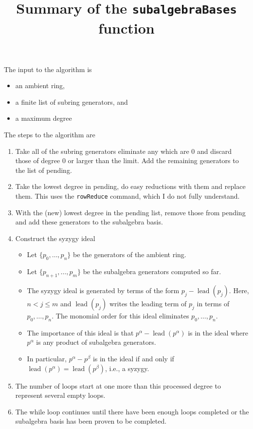 \documentclass[11pt]{amsart}
\title{Summary of the \texttt{subalgebraBases} function}
\DeclareMathOperator{\lead}{lead}
\newcommand{\alert}[1]{{\color{red}#1}}
\begin{document}
\maketitle

The input to the algorithm is
\begin{itemize}
\item an ambient ring,
\item a finite list of subring generators, and
\item a maximum degree
\end{itemize}
The steps to the algorithm are
\begin{enumerate}
\item Take all of the subring generators eliminate any which are 0 and discard those of degree 0 or larger than the limit.  Add the remaining generators to the list of pending.\label{step:discard}
\item Take the lowest degree in pending, do easy reductions with them and replace them.  \alert{This uses the \texttt{rowReduce} command, which I do not fully understand.}\label{step:lowestdegree}
\item With the (new) lowest degree in the pending list, remove those from pending and add these generators to the subalgebra basis.
\item Construct the syzygy ideal\label{step:syzygy}
\begin{itemize}
\item Let $\{p_0,\dots,p_n\}$ be the generators of the ambient ring.
\item Let $\{p_{n+1},\dots,p_m\}$ be the subalgebra generators computed so far.
\item The syzygy ideal is generated by terms of the form $p_j-\lead(p_j)$.  Here, $n<j\leq m$ and $\lead(p_j)$ writes the leading term of $p_j$ in terms of $p_0,\dots,p_n$.  The monomial order for this ideal eliminates $p_0,\dots,p_n$.
\item The importance of this ideal is that $p^\alpha-\lead(p^\alpha)$ is in the ideal where $p^\alpha$ is any product of subalgebra generators.
\item In particular, $p^\alpha-p^\beta$ is in the ideal if and only if $\lead(p^\alpha)=\lead(p^\beta)$, i.e., a syzygy.
\end{itemize}
\item The number of loops start at one more than this processed degree to represent several empty loops.
\item The while loop continues until there have been enough loops completed or the subalgebra basis has been proven to be completed.

\end{enumerate}
\end{document}
